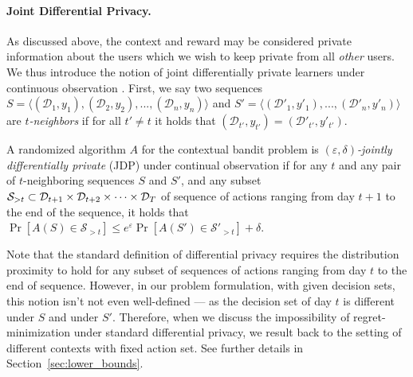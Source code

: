\documentclass{article}
\newcommand{\os}[1]{\textcolor{red}{Or's comment:~\textbf{#1}}}
\begin{document}
\paragraph{Joint Differential Privacy.}
As discussed above, the context and reward may be considered private
information about the users which we wish to keep private from all \emph{other} users. We thus introduce the notion of joint differentially private learners under continuous observation \citep[a combination of the two definitions given in][]{KearnsMechanismDesign2014,DworkContinualObservation2010}. First, we say two sequences $S = \langle (\mathcal{D}_1, y_1), (\mathcal{D}_2, y_2), ..., (\mathcal{D}_n, y_n) \rangle$ and $S' = \langle (\mathcal{D}'_1, y'_1), ..., (\mathcal{D}'_n, y'_n) \rangle$ are \emph{$t$-neighbors} if for all $t'\neq t$ it holds that $(\mathcal{D}_{t'},y_{t'}) = (\mathcal{D}'_{t'}, y'_{t'})$.

\begin{definition}
\label{def:JDP_continual_observation}
  A randomized algorithm $A$ for the contextual bandit problem is
  \emph{$(\varepsilon,\delta)$-jointly differentially private} (JDP) under continual observation if for any $t$ and any pair of $t$-neighboring sequences $S$ and $S'$, and any subset ${\cal S}_{>t} \subset \mathcal{D}_{t+1} \times \mathcal{D}_{t+2} \times \cdots \times \mathcal{D}_{T}$ of sequence of actions ranging from day $t+1$ to the end of the sequence, it holds that $\Pr[A(S)\in \mathcal{S}_{>t}] \leq e^\varepsilon\Pr[A(S')\in \mathcal{S}'_{>t}] +\delta$.
\end{definition}
Note that the standard definition of differential privacy requires the distribution proximity to hold for any subset of sequences of actions ranging from day $t$ to the end of sequence. However, in our problem formulation, with given decision sets, this notion isn't not even well-defined --- as the decision set of day $t$ is different under $S$ and under $S'$. Therefore, when we discuss the impossibility of regret-minimization under standard differential privacy, we result back to the setting of different contexts with fixed action set. See further details in Section~\ref{sec:lower_bounds}.
\end{document}

